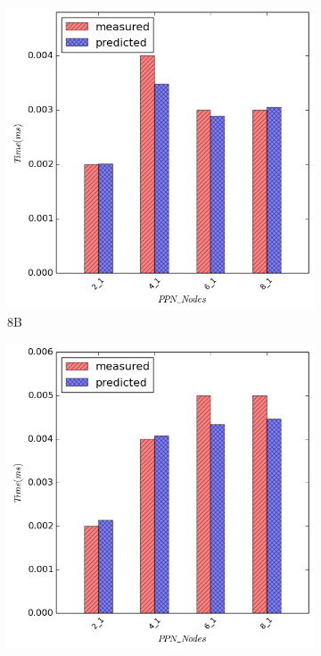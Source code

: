 \begin{figure}[H]
    \centering
    \captionsetup{justification=centering,margin=0cm,font=footnotesize}
    \begin{subfigure}[b]{0.4\textwidth}
        \includegraphics[width=\textwidth]{./images/broadcast/bcast_8.png}
        \caption{8B}
    \end{subfigure}
    \quad 
        \begin{subfigure}[b]{0.4\textwidth}
        \includegraphics[width=\textwidth]{./images/broadcast/bcast_1024.png}

\end{subfigure}
\end{figure}
